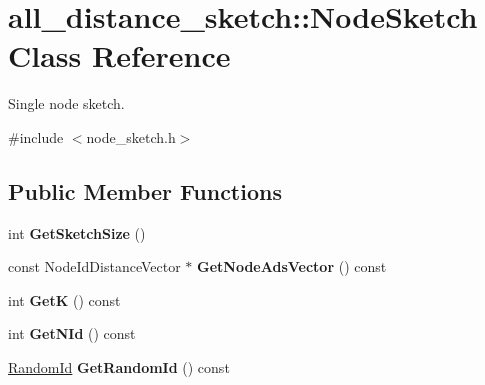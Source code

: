 \hypertarget{classall__distance__sketch_1_1NodeSketch}{}\section{all\+\_\+distance\+\_\+sketch\+:\+:Node\+Sketch Class Reference}
\label{classall__distance__sketch_1_1NodeSketch}


Single node sketch.  




{\ttfamily \#include $<$node\+\_\+sketch.\+h$>$}

\subsection*{Public Member Functions}
\begin{DoxyCompactItemize}
\item 
\hypertarget{classall__distance__sketch_1_1NodeSketch_ad7a0937c7470108e2a62b00288c1f7de}{}int {\bfseries Get\+Sketch\+Size} ()\label{classall__distance__sketch_1_1NodeSketch_ad7a0937c7470108e2a62b00288c1f7de}

\item 
\hypertarget{classall__distance__sketch_1_1NodeSketch_ac2200cc2ae91ab7745d4b3151229bfe3}{}const Node\+Id\+Distance\+Vector $\ast$ {\bfseries Get\+Node\+Ads\+Vector} () const \label{classall__distance__sketch_1_1NodeSketch_ac2200cc2ae91ab7745d4b3151229bfe3}

\item 
\hypertarget{classall__distance__sketch_1_1NodeSketch_af55cb9bdc148cba0c2bb35a8e101b6e9}{}int {\bfseries Get\+K} () const \label{classall__distance__sketch_1_1NodeSketch_af55cb9bdc148cba0c2bb35a8e101b6e9}

\item 
\hypertarget{classall__distance__sketch_1_1NodeSketch_a15156f70b8b148d4706ce13c3db5ead7}{}int {\bfseries Get\+N\+Id} () const \label{classall__distance__sketch_1_1NodeSketch_a15156f70b8b148d4706ce13c3db5ead7}

\item 
\hypertarget{classall__distance__sketch_1_1NodeSketch_a75e3d722870d4ff73e6943484a4ab62e}{}\hyperlink{namespaceall__distance__sketch_a07dc7ca615a83c4e656f52297eda4bb4}{Random\+Id} {\bfseries Get\+Random\+Id} () const \label{classall__distance__sketch_1_1NodeSketch_a75e3d722870d4ff73e6943484a4ab62e}

\end{DoxyCompactItemize}

